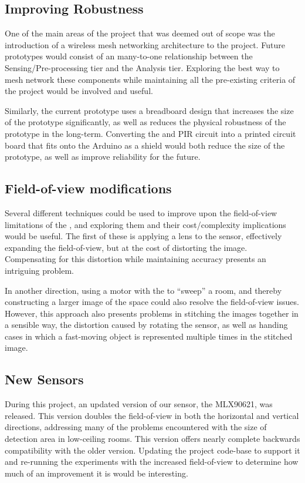 \documentclass[../thesis/thesis.tex]{subfiles}
\begin{document}
\subsection{Improving Robustness}
One of the main areas of the project that was deemed out of scope was the introduction of a wireless mesh networking architecture to the project. Future prototypes would consist of an many-to-one relationship between the Sensing/Pre-processing tier and the Analysis tier. Exploring the best way to mesh network these components while maintaining all the pre-existing criteria of the project would be involved and useful.

Similarly, the current prototype uses a breadboard design that increases the size of the prototype significantly, as well as reduces the physical robustness of the prototype in the long-term. Converting the \mlx and PIR circuit into a printed circuit board that fits onto the Arduino as a shield would both reduce the size of the prototype, as well as improve reliability for the future.

\subsection{Field-of-view modifications}
Several different techniques could be used to improve upon the field-of-view limitations of the \mlx, and exploring them and their cost/complexity implications would be useful. The first of these is applying a lens to the sensor, effectively expanding the field-of-view, but at the cost of distorting the image. Compensating for this distortion while maintaining accuracy presents an intriguing problem.

In another direction, using a motor with the \mlx to ``sweep'' a room, and thereby constructing a larger image of the space could also resolve the field-of-view issues. However, this approach also presents problems in stitching the images together in a sensible way, the distortion caused by rotating the sensor, as well as handing cases in which a fast-moving object is represented multiple times in the stitched image.

\subsection{New Sensors}
During this project, an updated version of our sensor, the MLX90621, was released. This version doubles the field-of-view in both the horizontal and vertical directions, addressing many of the problems encountered with the size of detection area in low-ceiling rooms. This version offers nearly complete backwards compatibility with the older version. Updating the project code-base to support it and re-running the experiments with the increased field-of-view to determine how much of an improvement it is would be interesting.
\end{document}
